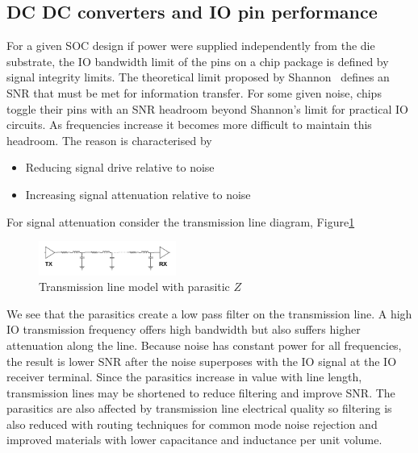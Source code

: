 \documentclass[letterpaper,twocolumn,10pt]{article}
\begin{document}
\subsection{DC DC converters and IO pin performance}

For a given SOC design if power were supplied independently from the die substrate, the IO bandwidth limit of the pins on a chip package is defined by signal integrity limits. The theoretical limit proposed by Shannon~\cite{Shannon1948} defines an SNR that must be met for information transfer. For some given noise, chips toggle their pins with an SNR headroom beyond Shannon's limit for practical IO circuits. As frequencies increase it becomes more difficult to maintain this headroom. The reason is characterised by 
\begin{itemize}
\item Reducing signal drive relative to noise
\item Increasing signal attenuation relative to noise
\end{itemize}


For signal attenuation consider the transmission line diagram, Figure\ref{TXLine}\\
\begin{figure}[here]
\includegraphics[width=0.4\textwidth]{TransmissionLine}
\caption{Transmission line model with parasitic $Z$}
\label{TXLine}
\end{figure}
We see that the parasitics create a low pass filter on the transmission line. A high IO transmission frequency offers high bandwidth but also suffers higher attenuation along the line. Because noise has constant power for all frequencies, the result is lower SNR after the noise superposes with the IO signal at the IO receiver terminal. Since the parasitics increase in value with line length, transmission lines may be shortened to reduce filtering and improve SNR. The parasitics are also affected by transmission line electrical quality so filtering is also reduced with routing techniques for common mode noise rejection and improved materials with lower capacitance and inductance per unit volume.
\end{document}

